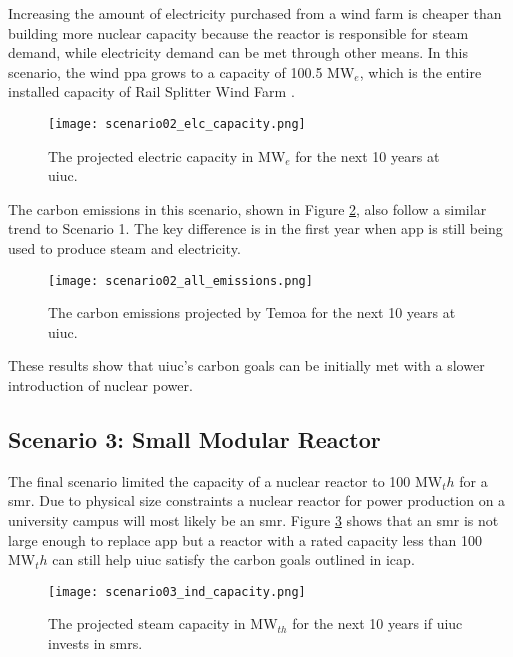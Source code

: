 Increasing the amount of electricity purchased
from a wind farm is cheaper than building more nuclear capacity because the
reactor is responsible for steam demand, while electricity demand can be met
through other means. In this scenario, the wind \gls{ppa} grows to a capacity of
100.5 MW$_e$, which is the entire installed capacity of Rail Splitter Wind Farm
\cite{breitweiser_wind_2016}.

\begin{figure}[ht!]
	\centering
	\texttt{[image: scenario02\_elc\_capacity.png]}
	\caption{The projected electric capacity in MW$_{e}$ for the next 10 years at
	\gls{uiuc}.}
	\label{fig:s02_elc_cap}
\end{figure}

The carbon emissions in this scenario, shown in Figure \ref{fig:s02_all_co2},
also follow a similar trend to Scenario 1. The key difference is in the first
year when \gls{app} is still being used to produce steam and electricity.

\begin{figure}[ht!]
	\centering
	\texttt{[image: scenario02\_all\_emissions.png]}
	\caption{The carbon emissions projected by Temoa for the next 10 years at
	\gls{uiuc}.}
	\label{fig:s02_all_co2}
\end{figure}
These results show that \gls{uiuc}'s carbon goals can be initially met with a
slower introduction of nuclear power.


\subsection{Scenario 3: Small Modular Reactor}
The final scenario limited the capacity of a nuclear reactor to 100  MW$_th$
for a \gls{smr}. Due to physical size constraints a nuclear reactor
for power production on a university campus will most likely be an \gls{smr}.
Figure \ref{fig:s03_ind_cap} shows that an \gls{smr} is not large enough
to replace \gls{app} but a reactor with a rated capacity less than 100 MW$_th$
can still help \gls{uiuc} satisfy the carbon goals outlined in \gls{icap}.

\begin{figure}[ht!]
	\centering
	\texttt{[image: scenario03\_ind\_capacity.png]}
	\caption{The projected steam capacity in MW$_{th}$ for the next 10 years if
	\gls{uiuc} invests in \glspl{smr}.}
	\label{fig:s03_ind_cap}
\end{figure}
